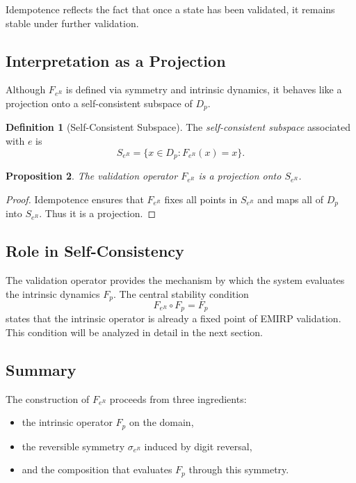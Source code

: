 \documentclass[11pt]{article}
\theoremstyle{definition}
\newtheorem{definition}{Definition}[section]
\theoremstyle{plain}
\newtheorem{proposition}[definition]{Proposition}
\theoremstyle{remark}
\begin{document}
Idempotence reflects the fact that once a state has been validated, it
remains stable under further validation.

\subsection{Interpretation as a Projection}

Although $F_{e^R}$ is defined via symmetry and intrinsic dynamics, it
behaves like a projection onto a self-consistent subspace of $D_p$.

\begin{definition}[Self-Consistent Subspace]
The \emph{self-consistent subspace} associated with $e$ is
\[
S_{e^R} = \{ x \in D_p : F_{e^R}(x) = x \}.
\]
\end{definition}

\begin{proposition}
The validation operator $F_{e^R}$ is a projection onto $S_{e^R}$.
\end{proposition}

\begin{proof}
Idempotence ensures that $F_{e^R}$ fixes all points in $S_{e^R}$ and
maps all of $D_p$ into $S_{e^R}$. Thus it is a projection.
\end{proof}

\subsection{Role in Self-Consistency}

The validation operator provides the mechanism by which the system
evaluates the intrinsic dynamics $F_p$. The central stability condition
\[
F_{e^R} \circ F_p = F_p
\]
states that the intrinsic operator is already a fixed point of EMIRP
validation. This condition will be analyzed in detail in the next
section.

\subsection{Summary}

The construction of $F_{e^R}$ proceeds from three ingredients:

\begin{itemize}
    \item the intrinsic operator $F_p$ on the domain,
    \item the reversible symmetry $\sigma_{e^R}$ induced by digit reversal,
    \item and the composition that evaluates $F_p$ through this symmetry.
\end{itemize}
\end{document}
